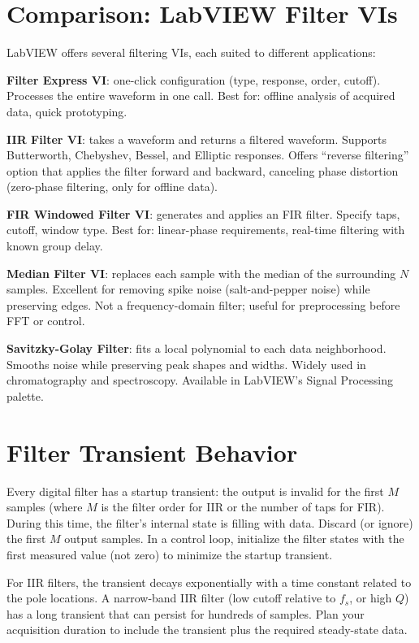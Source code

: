 \documentclass[11pt,letterpaper,twoside,openany]{book}
\begin{document}
\section{Comparison: LabVIEW Filter VIs}
LabVIEW offers several filtering VIs, each suited to different applications:

\textbf{Filter Express VI}: one-click configuration (type, response, order, cutoff). Processes the entire waveform in one call. Best for: offline analysis of acquired data, quick prototyping.

\textbf{IIR Filter VI}: takes a waveform and returns a filtered waveform. Supports Butterworth, Chebyshev, Bessel, and Elliptic responses. Offers ``reverse filtering'' option that applies the filter forward and backward, canceling phase distortion (zero-phase filtering, only for offline data).

\textbf{FIR Windowed Filter VI}: generates and applies an FIR filter. Specify taps, cutoff, window type. Best for: linear-phase requirements, real-time filtering with known group delay.

\textbf{Median Filter VI}: replaces each sample with the median of the surrounding $N$ samples. Excellent for removing spike noise (salt-and-pepper noise) while preserving edges. Not a frequency-domain filter; useful for preprocessing before FFT or control.

\textbf{Savitzky-Golay Filter}: fits a local polynomial to each data neighborhood. Smooths noise while preserving peak shapes and widths. Widely used in chromatography and spectroscopy. Available in LabVIEW's Signal Processing palette.

\section{Filter Transient Behavior}
Every digital filter has a startup transient: the output is invalid for the first $M$ samples (where $M$ is the filter order for IIR or the number of taps for FIR). During this time, the filter's internal state is filling with data. Discard (or ignore) the first $M$ output samples. In a control loop, initialize the filter states with the first measured value (not zero) to minimize the startup transient.

For IIR filters, the transient decays exponentially with a time constant related to the pole locations. A narrow-band IIR filter (low cutoff relative to $f_s$, or high $Q$) has a long transient that can persist for hundreds of samples. Plan your acquisition duration to include the transient plus the required steady-state data.
\end{document}

